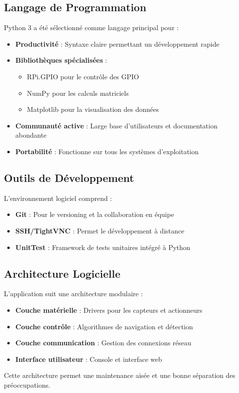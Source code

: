 \documentclass[a4paper, 12pt]{article}
\begin{document}
	\subsection{Langage de Programmation}
	
	Python 3 a été sélectionné comme langage principal pour :
	
	\begin{itemize}
		\item \textbf{Productivité} : Syntaxe claire permettant un développement rapide
		\item \textbf{Bibliothèques spécialisées} :
		\begin{itemize}
			\item RPi.GPIO pour le contrôle des GPIO
			\item NumPy pour les calculs matriciels
			\item Matplotlib pour la visualisation des données
		\end{itemize}
		
		\item \textbf{Communauté active} : Large base d'utilisateurs et documentation abondante
		\item \textbf{Portabilité} : Fonctionne sur tous les systèmes d'exploitation
	\end{itemize}
	
	\subsection{Outils de Développement}
	
	L'environnement logiciel comprend :
	
	\begin{itemize}
		\item \textbf{Git} : Pour le versioning et la collaboration en équipe
		\item \textbf{SSH/TightVNC} : Permet le développement à distance
		\item \textbf{UnitTest} : Framework de tests unitaires intégré à Python
	\end{itemize}
	
	\subsection{Architecture Logicielle}
	
	L'application suit une architecture modulaire :
	
	\begin{itemize}
		\item \textbf{Couche matérielle} : Drivers pour les capteurs et actionneurs
		\item \textbf{Couche contrôle} : Algorithmes de navigation et détection
		\item \textbf{Couche communication} : Gestion des connexions réseau
		\item \textbf{Interface utilisateur} : Console et interface web
	\end{itemize}
	
	Cette architecture permet une maintenance aisée et une bonne séparation des préoccupations.
\end{document}
